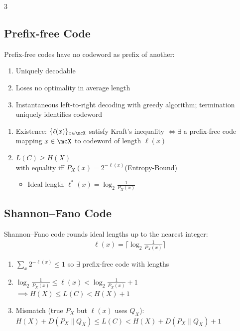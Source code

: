 \documentclass[12pt, a4paper]{article}
\begin{document}
\begin{multicols*}{3}
 
\subsection{Prefix-free Code}
Prefix-free codes have no codeword as prefix of another:
\begin{enumerate}[$+$]
  \item Uniquely decodable  
  \item Loses no optimality in average length
  \item Instantaneous left-to-right decoding with greedy algorithm; termination uniquely identifies codeword
\end{enumerate}
\begin{enumerate}[\roman*.]
    \item Existence: $\{\ell(x)\}_{x\in\mcX}$ satisfy Kraft's inequality $\iff \exists$ a prefix-free code mapping $x\in\mcX$ to codeword of length $\ell(x)$
  \item $L(C) \geq H(X)$\\with equality iff $P_X(x) = 2^{-\ell(x)}$\hfill(Entropy-Bound)\\ 
    \begin{itemize}[leftmargin=*]\vspace{3pt}
      \item Ideal length $\ell^*(x) = \log_2\frac{1}{P_X(x)}$
    \end{itemize}
\end{enumerate}
\begin{center}
\end{center}


\colbreak
\subsection{Shannon--Fano Code}
Shannon--Fano code rounds ideal lengths up to the nearest integer:
\begin{align*}
  \ell(x) = \lceil \log_2 \frac{1}{P_X(x)}\rceil
\end{align*}
\begin{enumerate}[\roman*.]
  \item $\sum_x 2^{-\ell(x)} \le 1$ so $\exists$ prefix-free code with lengths
  \item $\log_2 \frac{1}{P_X(x)} \leq \ell(x) < \log_2 \frac{1}{P_X(x)} + 1$\\$\implies H(X)\le L(C) < H(X)+1$
  \item Mismatch (true $P_X$ but $\ell(x)$ uses $Q_X$): \mbox{$H(X)+D(P_X\|Q_X)\le L(C) < H(X)+D(P_X\|Q_X)+1$}
\end{enumerate}


\end{multicols*}
\end{document}
